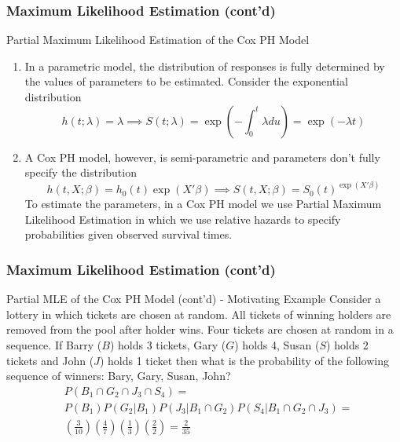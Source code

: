 \documentclass{beamer}
\theoremstyle{definition}
\begin{document}
\begin{frame}
\frametitle{Maximum Likelihood Estimation (cont'd)}
\begin{block}{Partial Maximum Likelihood Estimation of the Cox PH Model}
\begin{enumerate}
\item In a parametric model, the distribution of responses is fully determined by the values of parameters to be estimated. Consider the exponential distribution
\[
h(t;\lambda) = \lambda \implies S(t;\lambda) = \exp(-\int_0^t \lambda du) = \exp(-\lambda t)
\]
\item A Cox PH model, however, is semi-parametric and parameters don't fully specify the distribution
\[
h(t,X;\beta) = h_0(t)\exp(X'\beta) \implies S(t,X;\beta)= S_0(t)^{\exp(X'\beta)}
\]
To estimate the parameters, in a Cox PH model we use Partial Maximum Likelihood Estimation in which we use relative hazards to specify probabilities given observed survival times.
\end{enumerate}
\end{block}
\end{frame}

\begin{frame}
\frametitle{Maximum Likelihood Estimation (cont'd)}
\begin{block}{Partial MLE of the Cox PH Model (cont'd) - Motivating Example}
Consider a lottery in which tickets are chosen at random. All tickets of winning holders are removed from the pool after holder wins. Four tickets are chosen at random in a sequence. If
Barry ($B$) holds 3 tickets, Gary ($G$) holds 4, Susan ($S$) holds 2 tickets and John ($J$) holds 1 ticket then what is the probability of the following sequence of winners: Bary, Gary, Susan, John?
\begin{align*}
& P(B_1 \cap G_2 \cap J_3 \cap S_4) = \\
& P(B_1)P(G_2|B_1)P(J_3|B_1 \cap G_2)P(S_4|B_1 \cap G_2 \cap J_3) = \\
& \left(\frac{3}{10}\right) \left(\frac{4}{7}\right) \left(\frac{1}{3}\right) \left(\frac{2}{2}\right) = \frac{2}{35}
\end{align*}
\end{block}
\end{frame}
\end{document}
